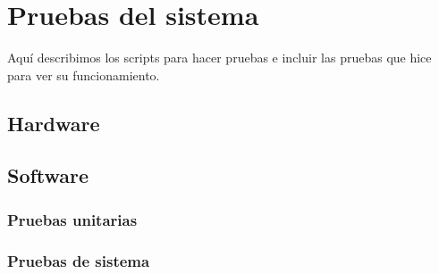 \section{Pruebas del sistema}
Aquí describimos los scripts para hacer pruebas e incluir las pruebas que hice para ver su funcionamiento.

\subsection{Hardware}


\subsection{Software}
\subsubsection{Pruebas unitarias}

\subsubsection{Pruebas de sistema}
